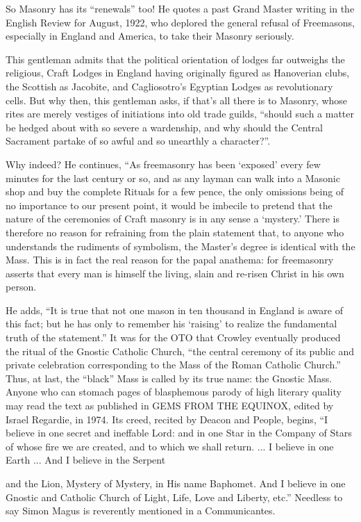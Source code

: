 So Masonry has its ``renewals'' too! He quotes a past Grand Master writing in the English Review for August, 1922, who deplored the general refusal of Freemasons, especially in England and America, to take their Masonry seriously.

This gentleman admits that the political orientation of lodges far outweighs the religious, Craft Lodges in England having originally figured as Hanoverian clubs, the Scottish as Jacobite, and Cagliosotro's Egyptian Lodges as revolutionary cells. But why then, this gentleman asks, if that's all there is to Masonry, whose rites are merely vestiges of initiations into old trade guilds, ``should such a matter be hedged about with so severe a wardenship, and why should the Central Sacrament partake of so awful and so unearthly a character?''.

Why indeed? He continues, ``As freemasonry has been `exposed' every few minutes for the last century or so, and as any layman can walk into a Masonic shop and buy the complete Rituals for a few pence, the only omissions being of no importance to our present point, it would be imbecile to pretend that the nature of the ceremonies of Craft masonry is in any sense a `mystery.' There is therefore no reason for refraining from the plain statement that, to anyone who understands the rudiments of symbolism, the Master's degree is identical with the Mass. This is in fact the real reason for the papal anathema: for freemasonry asserts that every man is himself the living, slain and re-risen Christ in his own person.

He adds, ``It is true that not one mason in ten thousand in England is aware of this fact; but he has only to remember his `raising' to realize the fundamental truth of the statement.'' It was for the OTO that Crowley eventually produced the ritual of the Gnostic Catholic Church, ``the central ceremony of its public and private celebration corresponding to the Mass of the Roman Catholic Church.'' Thus, at last, the ``black'' Mass is called by its true name: the Gnostic Mass. Anyone who can stomach pages of blasphemous parody of high literary quality may read the text as published in GEMS FROM THE EQUINOX, edited by Israel Regardie, in 1974. Its creed, recited by Deacon and People, begins, ``I believe in one secret and ineffable Lord: and in one Star in the Company of Stars of whose fire we are created, and to which we shall return.
... I believe in one Earth ... And I believe in the Serpent

and the Lion, Mystery of Mystery, in His name Baphomet. And I believe in one Gnostic and Catholic Church of Light, Life, Love and Liberty, etc.'' Needless to say Simon Magus is reverently mentioned in a Communicantes.

